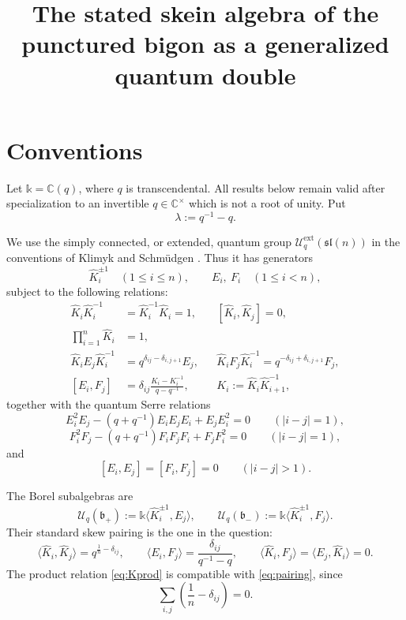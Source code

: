\documentclass[11pt]{amsart}
\title[The punctured bigon and a quantum double]{The stated skein algebra of the
punctured bigon as a generalized quantum double}
\date{}
\numberwithin{equation}{section}
\theoremstyle{definition}
\theoremstyle{remark}
\newcommand{\kk}{\mathbb{k}}
\newcommand{\Uc}{\mathcal{U}}
\newcommand{\fb}{\mathfrak{b}}
\newcommand{\sln}{\mathfrak{sl}(n)}
\newcommand{\la}{\langle}
\newcommand{\ra}{\rangle}
\begin{document}
\maketitle

\section{Conventions}

Let \(\kk=\mathbb{C}(q)\), where \(q\) is transcendental.  All results below remain
valid after specialization to an invertible \(q\in\mathbb{C}^{\times}\) which is not a
root of unity.  Put
\[
\lambda:=q^{-1}-q.
\]

We use the simply connected, or extended, quantum group
\(\Uc_q^{\mathrm{ext}}(\sln)\) in the conventions of Klimyk and Schm\"udgen
\cite{KS}.  Thus it has generators
\[
\widehat K_i^{\pm1}\quad(1\le i\le n),\qquad
E_i,\ F_i\quad(1\le i<n),
\]
subject to the following relations:
\begin{align}
\widehat K_i\widehat K_i^{-1}
&=\widehat K_i^{-1}\widehat K_i=1, &&
[\widehat K_i,\widehat K_j]=0,
\label{eq:Kcomm}\\
\prod_{i=1}^{n}\widehat K_i&=1, &&
\label{eq:Kprod}\\
\widehat K_iE_j\widehat K_i^{-1}
 &=q^{\delta_{ij}-\delta_{i,j+1}}E_j, &&
\widehat K_iF_j\widehat K_i^{-1}
 =q^{-\delta_{ij}+\delta_{i,j+1}}F_j,
 \label{eq:Kaction}\\
[E_i,F_j]
 &=\delta_{ij}\frac{K_i-K_i^{-1}}{q-q^{-1}},
 &&K_i:=\widehat K_i\widehat K_{i+1}^{-1},
 \label{eq:EFrel}
\end{align}
together with the quantum Serre relations
\begin{equation}\label{eq:ESerre}
E_i^2E_j-(q+q^{-1})E_iE_jE_i+E_jE_i^2=0
\qquad (|i-j|=1),
\end{equation}
\begin{equation}\label{eq:FSerre}
F_i^2F_j-(q+q^{-1})F_iF_jF_i+F_jF_i^2=0
\qquad (|i-j|=1),
\end{equation}
and
\[
[E_i,E_j]=[F_i,F_j]=0\qquad (|i-j|>1).
\]

The Borel subalgebras are
\[
\Uc_q(\fb_+)
 :=\kk\langle \widehat K_i^{\pm1},E_j\rangle,
\qquad
\Uc_q(\fb_-)
 :=\kk\langle \widehat K_i^{\pm1},F_j\rangle .
\]
Their standard skew pairing is the one in the question:
\begin{equation}\label{eq:pairing}
\la \widehat K_i,\widehat K_j\ra
   =q^{\frac1n-\delta_{ij}},\qquad
\la E_i,F_j\ra
   =\frac{\delta_{ij}}{q^{-1}-q},
\qquad
\la \widehat K_i,F_j\ra
   =\la E_j,\widehat K_i\ra=0.
\end{equation}
The product relation \eqref{eq:Kprod} is compatible with
\eqref{eq:pairing}, since
\[
\sum_{i,j}\left(\frac1n-\delta_{ij}\right)=0.
\]
\end{document}
